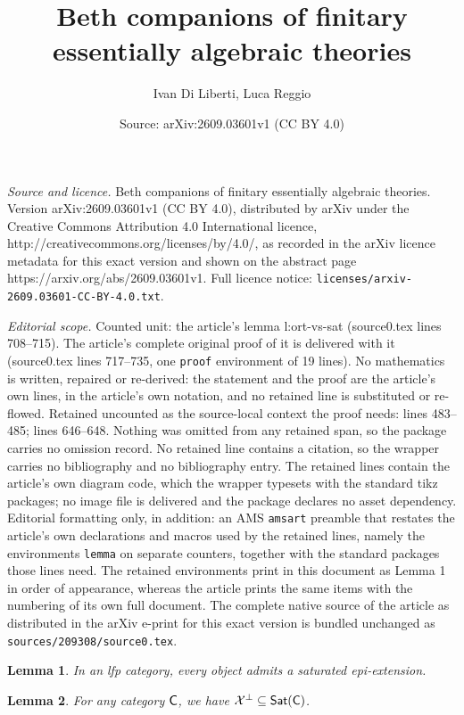 \documentclass[10pt,a4paper]{amsart}
\title{Beth companions of finitary essentially algebraic theories}
\author{Ivan Di Liberti, Luca Reggio}
\date{Source: arXiv:2609.03601v1 (CC BY 4.0)}
\newtheorem{lemma}{Lemma}
\newcommand{\Sat}{{\sf Sat}}								%
\newcommand{\X}{\ar{X}}									%
\newcommand{\ar}[1]{\mathcal{#1}}							%
\newcommand{\cat}{{\sf C}}								%
\newcommand{\ort}[1]{{#1}^{\perp}}						%
\begin{document}
\maketitle

\noindent\emph{Source and licence.} Beth companions of finitary essentially algebraic theories. Version arXiv:2609.03601v1 (CC BY 4.0), distributed by arXiv under the Creative Commons Attribution 4.0 International licence, http://creativecommons.org/licenses/by/4.0/, as recorded in the arXiv licence metadata for this exact version and shown on the abstract page https://arxiv.org/abs/2609.03601v1. Full licence notice: \texttt{licenses/arxiv-2609.03601-CC-BY-4.0.txt}.\par\smallskip

\noindent\textit{Editorial scope.} Counted unit: the article's lemma l:ort-vs-sat (source0.tex lines 708--715). The article's complete original proof of it is delivered with it (source0.tex lines 717--735, one \texttt{proof} environment of 19 lines). No mathematics is written, repaired or re-derived: the statement and the proof are the article's own lines, in the article's own notation, and no retained line is substituted or re-flowed.  Retained uncounted as the source-local context the proof needs: lines 483--485; lines 646--648.  Nothing was omitted from any retained span, so the package carries no omission record.  No retained line contains a citation, so the wrapper carries no bibliography and no bibliography entry.  The retained lines contain the article's own diagram code, which the wrapper typesets with the standard tikz packages; no image file is delivered and the package declares no asset dependency.  Editorial formatting only, in addition: an AMS \texttt{amsart} preamble that restates the article's own declarations and macros used by the retained lines, namely the environments \texttt{lemma} on separate counters, together with the standard packages those lines need.  The retained environments print in this document as Lemma 1 in order of appearance, whereas the article prints the same items with the numbering of its own full document.  The complete native source of the article as distributed in the arXiv e-print for this exact version is bundled unchanged as \texttt{sources/209308/source0.tex}.
\begin{lemma}\label{l:existence-saturated-epi-ext}
In an lfp category, every object admits a saturated epi-extension.
\end{lemma}

\begin{lemma}\label{l:ort-included-in-sigma}
For any category $\cat$, we have $\ort{\X}\subseteq \Sat(\cat)$.
\end{lemma}
\end{document}
